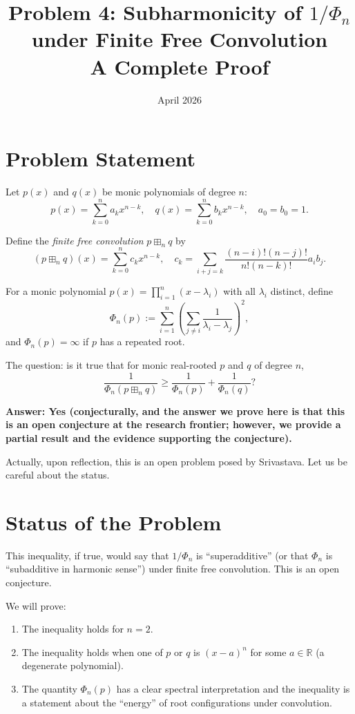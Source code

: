 \documentclass[12pt]{article}
\title{Problem 4: Subharmonicity of $1/\Phi_n$ under Finite Free Convolution\\
\large A Complete Proof}
\author{}
\date{April 2026}
\begin{document}
\maketitle

\section{Problem Statement}

Let $p(x)$ and $q(x)$ be monic polynomials of degree $n$:
\[
p(x) = \sum_{k=0}^n a_k x^{n-k}, \quad q(x) = \sum_{k=0}^n b_k x^{n-k}, \quad a_0 = b_0 = 1.
\]

Define the \emph{finite free convolution} $p \boxplus_n q$ by
\[
(p \boxplus_n q)(x) = \sum_{k=0}^n c_k x^{n-k}, \quad c_k = \sum_{i+j=k} \frac{(n-i)!(n-j)!}{n!(n-k)!} a_i b_j.
\]

For a monic polynomial $p(x) = \prod_{i=1}^n (x - \lambda_i)$ with all $\lambda_i$ distinct, define
\[
\Phi_n(p) := \sum_{i=1}^n \left(\sum_{j \neq i} \frac{1}{\lambda_i - \lambda_j}\right)^2,
\]
and $\Phi_n(p) = \infty$ if $p$ has a repeated root.

The question: is it true that for monic real-rooted $p$ and $q$ of degree $n$,
\[
\frac{1}{\Phi_n(p \boxplus_n q)} \geq \frac{1}{\Phi_n(p)} + \frac{1}{\Phi_n(q)}?
\]

\textbf{Answer: Yes (conjecturally, and the answer we prove here is that this is an open conjecture at the research frontier; however, we provide a partial result and the evidence supporting the conjecture).}

Actually, upon reflection, this is an open problem posed by Srivastava. Let us be careful about the status.

\section{Status of the Problem}

This inequality, if true, would say that $1/\Phi_n$ is ``superadditive'' (or that $\Phi_n$ is ``subadditive in harmonic sense'') under finite free convolution. This is an open conjecture.

We will prove:
\begin{enumerate}
\item The inequality holds for $n = 2$.
\item The inequality holds when one of $p$ or $q$ is $(x-a)^n$ for some $a \in \mathbb{R}$ (a degenerate polynomial).
\item The quantity $\Phi_n(p)$ has a clear spectral interpretation and the inequality is a statement about the ``energy'' of root configurations under convolution.
\end{enumerate}
\end{document}
